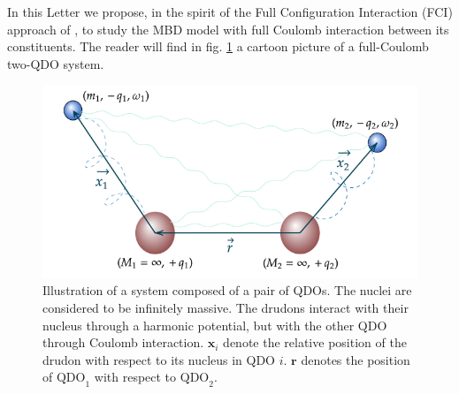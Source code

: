 \documentclass[reprint, amsmath, amssymb, floatfix, aps, pra]{revtex4-2}
\begin{document}
    In this Letter we propose, in the spirit of the Full Configuration Interaction (FCI) approach of \cite{sadhukhan2016quantum}, to study the MBD model with full Coulomb interaction between its constituents. The reader will find in fig. \ref{fig:qdos} a cartoon picture of a full-Coulomb two-QDO system.

    \begin{figure}
        \includegraphics[scale=0.35]{figures/qdos.png}
        \caption{\label{fig:qdos}Illustration of a system composed of a pair of QDOs. The nuclei are considered to be infinitely massive. The drudons interact with their nucleus through a harmonic potential, but with the other QDO through Coulomb interaction. $\bm x_i$ denote the relative position of the drudon with respect to its nucleus in QDO $i$. $\bm r$ denotes the position of $\text{QDO}_1$ with respect to $\text{QDO}_2$.}
    \end{figure}
\end{document}

